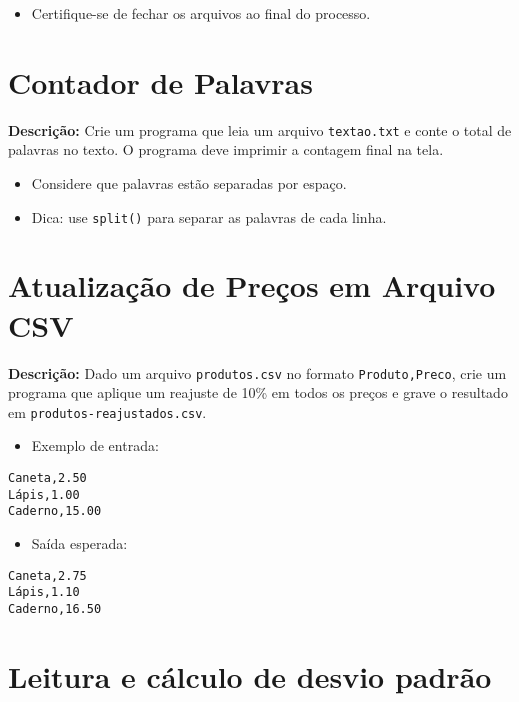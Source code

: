 \begin{itemize}
    \item Certifique-se de fechar os arquivos ao final do processo.
\end{itemize}

\section{Contador de Palavras}

\textbf{Descrição:}  
Crie um programa que leia um arquivo \texttt{textao.txt} e conte o total de palavras no texto. O programa deve imprimir a contagem final na tela.

\begin{itemize}
    \item Considere que palavras estão separadas por espaço.
    \item Dica: use \texttt{split()} para separar as palavras de cada linha.
\end{itemize}

\section{Atualização de Preços em Arquivo CSV}

\textbf{Descrição:}  
Dado um arquivo \texttt{produtos.csv} no formato \texttt{Produto,Preco}, crie um programa que aplique um reajuste de 10\% em todos os preços e grave o resultado em \texttt{produtos-reajustados.csv}.

\begin{itemize}
    \item Exemplo de entrada:
\end{itemize}

\begin{verbatim}
Caneta,2.50
Lápis,1.00
Caderno,15.00
\end{verbatim}

\begin{itemize}
    \item Saída esperada:
\end{itemize}

\begin{verbatim}
Caneta,2.75
Lápis,1.10
Caderno,16.50
\end{verbatim}

\section{Leitura e cálculo de desvio padrão}

